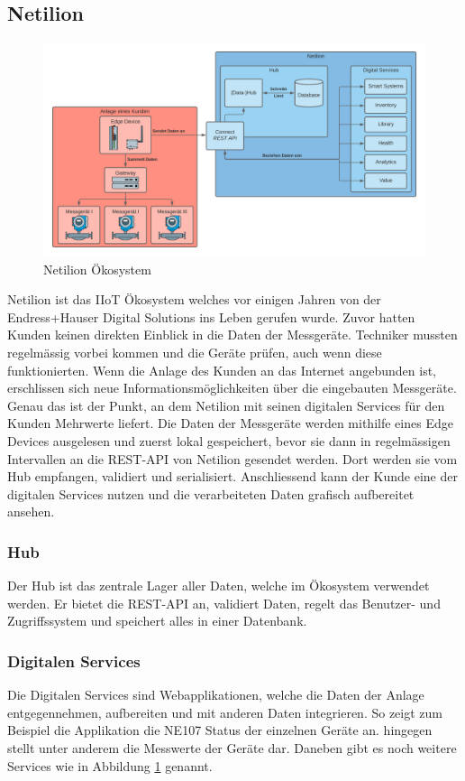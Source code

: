 \subsection{Netilion} \label{arch-netilion}
\begin{figure}[!ht]
  \centering
  \includegraphics[width=.95\linewidth]{./images/Netilion.png}
  \caption[{Diagramm Netilion Ökosystem von Jonas Schultheiss}]{Netilion Ökosystem}
  \label{fig:netilion}
\end{figure}
Netilion ist das IIoT Ökosystem welches vor einigen Jahren von der Endress+Hauser Digital Solutions ins Leben gerufen wurde. Zuvor hatten Kunden keinen direkten Einblick in die Daten der Messgeräte. Techniker mussten regelmässig vorbei kommen und die Geräte prüfen, auch wenn diese funktionierten. Wenn die Anlage des Kunden an das Internet angebunden ist, erschlissen sich neue Informationsmöglichkeiten über die eingebauten Messgeräte. Genau das ist der Punkt, an dem Netilion mit seinen digitalen Services für den Kunden Mehrwerte liefert.
\newline
Die Daten der Messgeräte werden mithilfe eines Edge Devices ausgelesen und zuerst lokal gespeichert, bevor sie dann in regelmässigen Intervallen an die REST-API von Netilion gesendet werden. Dort werden sie vom Hub empfangen, validiert und serialisiert. Anschliessend kann der Kunde eine der digitalen Services nutzen und die verarbeiteten Daten grafisch aufbereitet ansehen.
\subsubsection{Hub}
Der Hub ist das zentrale Lager aller Daten, welche im Ökosystem verwendet werden. Er bietet die REST-API an, validiert Daten, regelt das Benutzer- und Zugriffssystem und speichert alles in einer Datenbank.
\subsubsection{Digitalen Services}
Die Digitalen Services sind Webapplikationen, welche die Daten der Anlage entgegennehmen, aufbereiten und mit anderen Daten integrieren. So zeigt zum Beispiel die Applikation  die NE107 Status der einzelnen Geräte an.  hingegen stellt unter anderem die Messwerte der Geräte dar. Daneben gibt es noch weitere Services wie in Abbildung \ref{fig:netilion} genannt.


